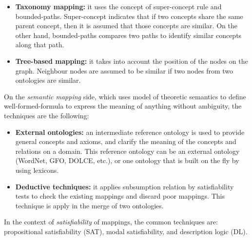 \documentclass[runningheads]{llncs}
\begin{document}
\begin{itemize}
    \item\textbf{ Taxonomy mapping:} it uses the concept of super-concept rule and bounded-paths. Super-concept indicates that if two concepts share the same parent concept, then it is assumed that those concepts are similar. On the other hand, bounded-paths compares two paths to identify similar concepts along that path.
    \item \textbf{Tree-based mapping:} it takes into account the position of the nodes on the graph. Neighbour nodes are assumed to be similar if two nodes from two ontologies are similar.
\end{itemize}
On the \textit{semantic mapping} side, which uses model of theoretic semantics to define well-formed-formula to express the meaning of anything without ambiguity, the techniques are the following:
\begin{itemize}
    \item \textbf{External ontologies:} an intermediate reference ontology is used to provide general concepts and axioms, and clarify the meaning of the concepts and relations on a domain. This reference ontology can be an external ontology (WordNet, GFO, DOLCE, etc.), or one ontology that is built on the fly by using lexicons.
    \item \textbf{Deductive techniques:} it applies subsumption relation by satisfiability tests to check the existing mappings and discard poor mappings. This technique is apply in the merge of two ontologies.
\end{itemize}
 In the context of \textit{satisfiability} of mappings, the common techniques are: propositional satisfiability (SAT), modal satisfiability, and description logic (DL).
\end{document}
